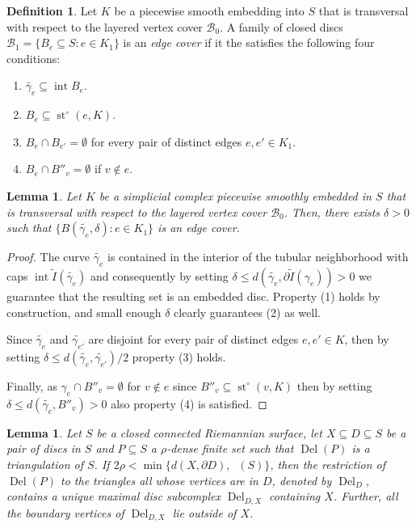\documentclass[reqno,english]{amsart}
\newtheorem{lemma}[theorem]{Lemma}
\numberwithin{claimcounter}{theorem}
\theoremstyle{remark}
\theoremstyle{definition}
\newtheorem{definition}[theorem]{Definition}
\numberwithin{theorem}{section}
\DeclareMathOperator{\st}{st}
\DeclareMathOperator{\interior}{int}
\DeclareMathOperator{\rscv}{r_{scv}}
\DeclareMathOperator{\Del}{Del}
\begin{document}
\begin{definition}
    Let $K$ be a piecewise smooth embedding into $S$ that is transversal with respect to the layered vertex cover $\mathcal{B}_0$. A family of closed discs $\mathcal{B}_1 = \{B_e \subseteq S\colon e\in K_1\}$ is an \emph{edge cover} if it the satisfies the following four conditions: 
    \begin{enumerate}
        \item $\widetilde{\gamma_e}\subseteq \interior B_e$.
        \item $B_e \subseteq \st^\circ(e,K)$.
        \item $B_e\cap B_{e'} = \emptyset$ for every pair of distinct edges $e,e'\in K_1$.
        \item $B_e\cap B''_v = \emptyset$ if $v\notin e$.
    \end{enumerate}
\end{definition}

\begin{lemma}
\label{l:edge-neigh}
    Let $K$ be a simplicial complex piecewise smoothly embedded in $S$ that is transversal with respect to the layered vertex cover $\mathcal{B}_0$. Then, there exists $\delta>0$ such that $\{B(\widetilde{\gamma_e},\delta) \colon e\in K_1\}$ is an edge cover.
\end{lemma}
\begin{proof}
    The curve $\widetilde{\gamma_e}$ is contained in the interior of the tubular neighborhood with caps $\interior\widetilde{I}(\widetilde{\gamma_e})$ and consequently by setting $\delta \leq d(\widetilde{\gamma_e},\partial \widetilde{I}(\gamma_e)) > 0$ we guarantee that the resulting set is an embedded disc. Property (1) holds by construction, and small enough $\delta$ clearly guarantees (2) as well. 
    
    Since $\widetilde{\gamma_e}$ and $\widetilde{\gamma_{e'}}$ are disjoint for every pair of distinct edges $e,e'\in K$, then by setting $\delta 
    \leq d(\widetilde{\gamma_e},\widetilde{\gamma_{e'}})/2$ property (3) holds. 
    
    Finally, as $\gamma_e \cap B''_v = \emptyset$ for $v\notin e$ since $B''_v\subseteq \st^\circ(v,K)$ then by setting $\delta \leq d(\widetilde{\gamma_e},B''_v)>0$ also property (4) is satisfied.
\end{proof}

\begin{lemma}
    \label{l:del-neigh}
    Let $S$ be a closed connected Riemannian surface, 
    let $X \subseteq D\subseteq S$ be a pair of discs in $S$ and $P\subseteq S$ a $\rho$-dense finite set such that $\Del(P)$ is a triangulation of $S$. 
    If $2\rho < \min \{d(X,\partial D), \rscv(S) \}$, then the restriction of $\Del(P)$ to the triangles all whose vertices are in $D$, denoted by $\Del_D$, 
    contains a unique maximal disc subcomplex $\Del_{D,X}$ containing $X$. Further, all the boundary vertices of $\Del_{D,X}$ lie outside of $X$.
\end{lemma}
\end{document}
